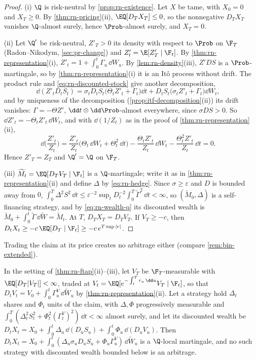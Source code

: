 \begin{proof}
(i) $\Q$ is risk-neutral by \cref{prop:rn-existence}. Let $X$ be tame, with $X_0=0$ and
$X_T\ge0$. By \cref{thm:rn-pricing}(ii), $\EQ[D_TX_T]\le0$, so the nonnegative $D_TX_T$
vanishes $\Q$-almost surely, hence $\Prob$-almost surely, and $X_T=0$.

(ii) Let $\Q'$ be risk-neutral, $Z'_T>0$ its density with respect to $\Prob$ on $\F_T$
(Radon--Nikodym, \cref{sec:pr-change}) and $Z'_t=\E[Z'_T\mid\F_t]$. By
\cref{thm:rn-representation}(i), $Z'_t=1+\int_0^t\Gamma_u\,\dd W_u$. By
\cref{lem:rn-density}(iii), $Z'DS$ is a $\Prob$-martingale, so by
\cref{thm:rn-representation}(i) it is an It\^o process without drift. The product rule and
\eqref{eq:rn-discounted-stock} give another decomposition,
\[
  \dd(Z'_tD_tS_t)=\sigma_tD_tS_t\big(\Theta_tZ'_t+\Gamma_t\big)\dd t
  +D_tS_t\big(\sigma_tZ'_t+\Gamma_t\big)\dd W_t ,
\]
and by uniqueness of the decomposition (\cref{prop:itf-decomposition}(ii)) its drift
vanishes: $\Gamma=-\Theta Z'$, $\dd t\otimes\dd\Prob$-almost everywhere, since $\sigma DS>0$.
So $\dd Z'_t=-\Theta_tZ'_t\,\dd W_t$, and with $\dd(1/Z_t)$ as in the proof of
\cref{thm:rn-representation}(ii),
\[
  \dd\Big(\frac{Z'_t}{Z_t}\Big)=\frac{Z'_t}{Z_t}\big(\Theta_t\,\dd W_t+\Theta_t^2\,\dd t\big)
  -\frac{\Theta_tZ'_t}{Z_t}\,\dd W_t-\frac{\Theta_t^2Z'_t}{Z_t}\,\dd t=0 .
\]
Hence $Z'_T=Z_T$ and $\Q'=\Q$ on $\F_T$.

(iii) $\widetilde M_t=\EQ[D_TV_T\mid\F_t]$ is a $\Q$-martingale; write it as in
\cref{thm:rn-representation}(ii) and define $\Delta$ by \eqref{eq:rn-hedge}. Since
$\sigma\ge\varepsilon$ and $D$ is bounded away from $0$,
$\int_0^T\Delta^2S^2\,\dd t\le\varepsilon^{-2}\sup_t D_t^{-2}\int_0^T\widetilde\Gamma^2\,\dd
t<\infty$, so $(\widetilde M_0,\Delta)$ is a self-financing strategy, and by
\eqref{eq:rn-wealth-q} its discounted wealth is
$\widetilde M_0+\int_0^t\widetilde\Gamma\,\dd\widetilde W=\widetilde M_t$. At $T$,
$D_TX_T=D_TV_T$. If $V_T\ge-c$, then $D_tX_t\ge-c\,\EQ[D_T\mid\F_t]\ge-c\,e^{T\sup|r|}$.
\end{proof}

Trading the claim at its price creates no arbitrage either (compare \cref{rem:bin-extended}).

\begin{corollary}\label{cor:rn-extended-market}
In the setting of \cref{thm:rn-ftap}(ii)--(iii), let $V_T$ be $\F_T$-measurable with
$\EQ[D_T|V_T|]<\infty$, traded at $V_t=\EQ[e^{-\int_t^Tr_u\,\dd u}V_T\mid\F_t]$, so that
$D_tV_t=V_0+\int_0^t\Gamma^V_u\,\dd\widetilde W_u$ by \cref{thm:rn-representation}(ii). Let a
strategy hold $\Delta_t$ shares and $\Phi_t$ units of the claim, with $\Delta,\Phi$ progressively
measurable and $\int_0^T(\Delta_t^2S_t^2+\Phi_t^2(\Gamma^V_t)^2)\,\dd t<\infty$ almost surely, and
let its discounted wealth be
$D_tX_t=X_0+\int_0^t\Delta_u\,\dd(D_uS_u)+\int_0^t\Phi_u\,\dd(D_uV_u)$. Then
$D_tX_t=X_0+\int_0^t(\Delta_u\sigma_uD_uS_u+\Phi_u\Gamma^V_u)\,\dd\widetilde W_u$ is a $\Q$-local
martingale, and no such strategy with discounted wealth bounded below is an arbitrage.
\end{corollary}

